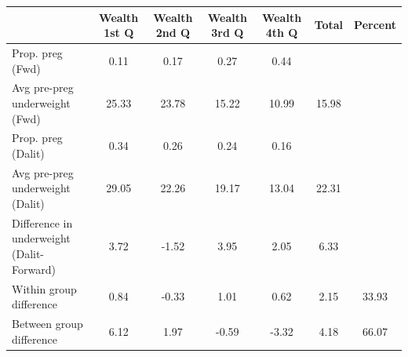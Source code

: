 \begin{tabular}{l*{6}{c}}
\toprule
            &\multicolumn{1}{c}{Wealth 1st Q}&\multicolumn{1}{c}{Wealth 2nd Q}&\multicolumn{1}{c}{Wealth 3rd Q}&\multicolumn{1}{c}{Wealth 4th Q}&\multicolumn{1}{c}{Total}&\multicolumn{1}{c}{Percent}\\
\midrule
\midrule
Prop. preg (Fwd)&        0.11&        0.17&        0.27&        0.44&            &            \\
Avg pre-preg underweight (Fwd)&       25.33&       23.78&       15.22&       10.99&       15.98&            \\
Prop. preg (Dalit)&        0.34&        0.26&        0.24&        0.16&            &            \\
Avg pre-preg underweight (Dalit)&       29.05&       22.26&       19.17&       13.04&       22.31&            \\
Difference in underweight (Dalit-Forward)&        3.72&       -1.52&        3.95&        2.05&        6.33&            \\
Within group difference&        0.84&       -0.33&        1.01&        0.62&        2.15&       33.93\\
Between group difference&        6.12&        1.97&       -0.59&       -3.32&        4.18&       66.07\\
\bottomrule
\end{tabular}
